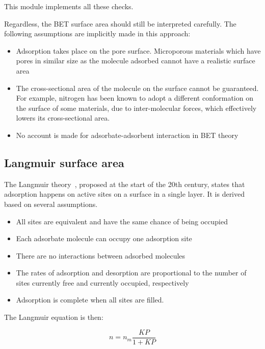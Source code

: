 This module implements all these checks.

Regardless, the BET surface area should still be interpreted carefully.
The following assumptions are implicitly made in this approach:

\begin{itemize}

    \item Adsorption takes place on the pore surface. Microporous materials
            which have pores in similar size as the molecule adsorbed
            cannot have a realistic surface area
    \item The cross-sectional area of the molecule on the surface
            cannot be guaranteed. For example, nitrogen has been known to adopt
            a different conformation on the surface of some materials,
            due to inter-molecular forces, which effectively
            lowers its cross-sectional area.
    \item No account is made for adsorbate-adsorbent interaction in BET theory

\end{itemize}


\subsection{Langmuir surface area}

The Langmuir theory~\cite{langmuirAdsorptionGasesPlane1918a}, 
proposed at the start of the 20th century,
states that adsorption happens on active sites on a surface
in a single layer. It is derived based on several assumptions.

\begin{itemize}
    \item All sites are equivalent and have the same chance of being occupied
    \item Each adsorbate molecule can occupy one adsorption site
    \item There are no interactions between adsorbed molecules
    \item The rates of adsorption and desorption are proportional to the number
            of sites currently free and currently occupied, respectively
    \item Adsorption is complete when all sites are filled.
\end{itemize}

The Langmuir equation is then:

\begin{equation}
    n = n_m\frac{KP}{1+KP}
\end{equation}


